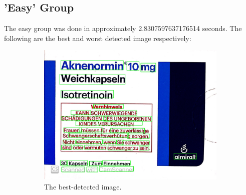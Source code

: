 \documentclass[10pt, a4paper]{article}
\begin{document}
\subsection{'Easy' Group} %
\label{sub:easy}
The easy group was done in approximately 2.8307597637176514 seconds. The following are the best and worst detected image respectively:
\begin{figure}[h!]
	\centering
	\begin{subfigure}[b]{0.4\linewidth}
		\includegraphics[width=\linewidth]{jupyter/results/easy/sample_output_3.jpeg}
		\caption{The best-detected image.}
	\end{subfigure}
	\begin{subfigure}[b]{0.4\linewidth}

\end{subfigure}
\end{figure}
\end{document}
